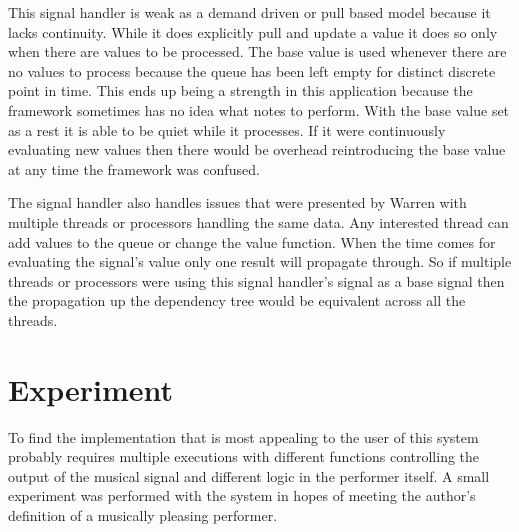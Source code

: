 \documentclass[12pt]{ucthesis}
\begin{document}
This signal handler is weak as a demand driven or pull based model because it lacks continuity. While it does explicitly pull and update a value it does so only when there are values to be processed. The base value is used whenever there are no values to process because the queue has been left empty for distinct discrete point in time. This ends up being a strength in this application because the framework sometimes has no idea what notes to perform. With the base value set as a rest it is able to be quiet while it processes. If it were continuously evaluating new values then there would be overhead reintroducing the base value at any time the framework was confused. 

The signal handler also handles issues that were presented by Warren with multiple threads or processors handling the same data. Any interested thread can add values to the queue or change the value function. When the time comes for evaluating the signal's value only one result will propagate through. So if multiple threads or processors were using this signal handler's signal as a base signal then the propagation up the dependency tree would be equivalent across all the threads. 


\chapter{Experiment}
\label {experiment}
To find the implementation that is most appealing to the user of this system probably requires multiple executions with different functions controlling the output of the musical signal and different logic in the performer itself. A small experiment was performed with the system in hopes of meeting the author's definition of a musically pleasing performer. 
\end{document}
